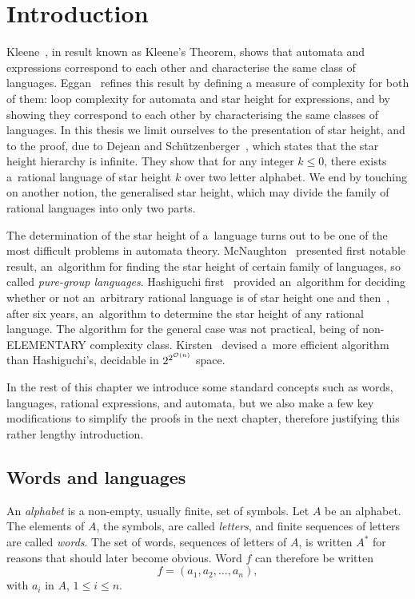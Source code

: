 \chapter{Introduction}

Kleene~\cite{Kleene56}, in result known as Kleene’s Theorem, shows that automata and expressions correspond to each other and characterise the same class of languages. Eggan~\cite{Eggan63} refines this result by defining a measure of complexity for both of them: loop complexity for automata and star height for expressions, and by showing they correspond to each other by characterising the same classes of languages. In this thesis we limit ourselves to the presentation of star height, and to the proof, due to Dejean and Schützenberger~\cite{DejeanSchutzenberger66}, which states that the star height hierarchy is infinite. They show that for any integer $k \leq 0$, there exists a~rational language of star height $k$ over two letter alphabet. We end by touching on another notion, the generalised star height, which may divide the family of rational languages into only two parts.

The determination of the star height of a~language turns out to be one of the most difficult problems in automata theory. McNaughton~\cite{McNaughton67} presented first notable result, an~algorithm for finding the star height of certain family of languages, so called \emph{pure-group languages}. Hashiguchi first~\cite{Hashiguchi1982} provided an~algorithm for deciding whether or not an~arbitrary rational language is of star height one and then~\cite{Hashiguchi1988}, after six years, an~algorithm to determine the star height of any rational language. The algorithm for the general case was not practical, being of non-\textsc{ELEMENTARY} complexity class. Kirsten~\cite{Kirsten05} devised a~more efficient algorithm than Hashiguchi's, decidable in $2^{2^{{\mathcal{O}}(n)}}$ space.

In the rest of this chapter we introduce some standard concepts such as words, languages, rational expressions, and automata, but we also make a few key modifications to simplify the proofs in the next chapter, therefore justifying this rather lengthy introduction.

\section{Words and languages}

An \emph{alphabet} is a non-empty, usually finite, set of symbols. Let $A$ be an alphabet. The elements of $A$, the symbols, are called \emph{letters}, and finite sequences of letters are called \emph{words}. The set of words, sequences of letters of $A$, is written $A^*$ for reasons that should later become obvious. Word $f$ can therefore be written
\[
    f = (a_1, a_2, \dotsc, a_n),
\]
with $a_i$ in $A$, $1 \leq i \leq n$.

